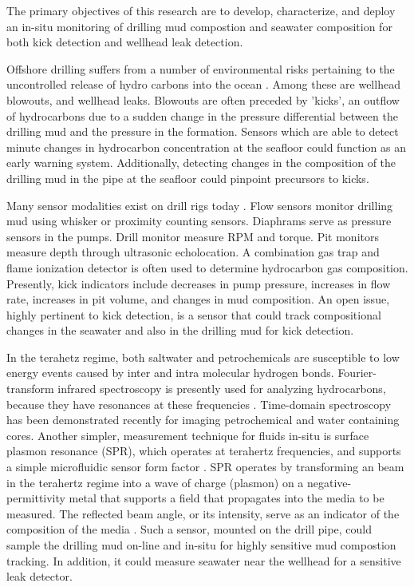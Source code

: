 
The primary objectives of this research are to develop, characterize, and deploy an in-situ monitoring of drilling mud compostion and seawater composition for both kick detection and wellhead leak detection.


Offshore drilling suffers from a number of environmental risks pertaining to the uncontrolled release of hydro carbons into the ocean \cite{vinnem2014lessons, skogdalen2012quantitative}. Among these are wellhead blowouts, and wellhead leaks. Blowouts are often preceded by 'kicks', an outflow of hydrocarbons due to a sudden change in the pressure differential between the drilling mud and the pressure in the formation. Sensors which are able to detect minute changes in hydrocarbon concentration at the seafloor could function as an early warning system. Additionally, detecting changes in the composition of the drilling mud in the pipe at the seafloor could pinpoint precursors to kicks.

Many sensor modalities exist on drill rigs today \cite{petrowiki}. Flow sensors monitor drilling mud using whisker or proximity counting sensors. Diaphrams serve as pressure sensors in the pumps. Drill monitor measure RPM and torque. Pit monitors measure depth through ultrasonic echolocation. A combination gas trap and flame ionization detector is often used to determine hydrocarbon gas composition. Presently, kick indicators include decreases in pump pressure, increases in flow rate, increases in pit volume, and changes in mud composition. An open issue, highly pertinent to kick detection, is a sensor that could track compositional changes in the seawater and also in the drilling mud for kick detection.

In the terahetz regime, both saltwater \cite{xu20070} and petrochemicals \cite{wilt1998determination,jin2008analysis} are susceptible to low energy events caused by inter and intra molecular hydrogen bonds. Fourier-transform infrared spectroscopy is presently used for analyzing hydrocarbons, because they have resonances at these frequencies \cite{fodor1996analysis,wilt1998determination}. Time-domain spectroscopy has been demonstrated recently for imaging petrochemical and water containing cores. Another simpler, measurement technique for fluids in-situ is surface plasmon resonance (SPR), which operates at terahertz frequencies, and supports a simple microfluidic sensor form factor \cite{shibayama2016surface}. SPR operates by transforming an beam in the terahertz regime into a wave of charge (plasmon) on a negative-permittivity metal that supports a field that propagates into the media to be measured. The reflected beam angle, or its intensity, serve as an indicator of the composition of the media \cite{raether1988surface}. Such a sensor, mounted on the drill pipe, could sample the drilling mud on-line and in-situ for highly sensitive mud compostion tracking. In addition, it could measure seawater near the wellhead for a sensitive leak detector.


